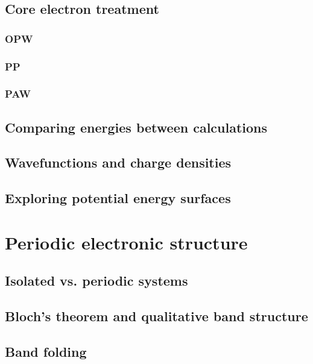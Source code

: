 \documentclass[11pt]{article}
\begin{document}
\subsection{Core electron treatment}
\label{sec:org96359f6}

\subsubsection{OPW}
\label{sec:org18d9f5f}

\subsubsection{PP}
\label{sec:org5a50a9d}

\subsubsection{PAW}
\label{sec:orgc55b363}

\subsection{Comparing energies between calculations}
\label{sec:orgbce8ccb}

\subsection{Wavefunctions and charge densities}
\label{sec:org7f2dca7}

\subsection{Exploring potential energy surfaces}
\label{sec:org06f1eb1}
\newpage
\section{Periodic electronic structure}
\label{sec:orged35829}
\subsection{Isolated vs. periodic systems}
\label{sec:org15429e3}
\subsection{Bloch's theorem and qualitative band structure}
\label{sec:org1b81c8f}
\subsection{Band folding}
\label{sec:org5db0e24}
\end{document}
